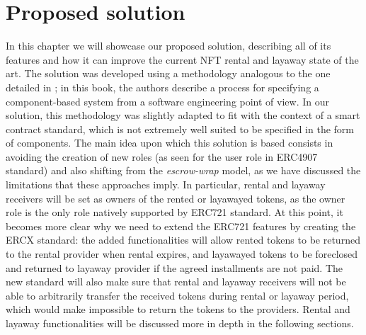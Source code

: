 \documentclass[english, LaM, oneside]{sapthesis}%
\begin{document}
\chapter{Proposed solution}
\label{chap:2}
In this chapter we will showcase our proposed solution, describing all of its features and how it can improve the current NFT rental and layaway state of the art. \newline
The solution was developed using a methodology analogous to the one detailed in \cite{ref:UML}; in this book, the authors describe a process for specifying a component-based system from a software engineering point of view. In our solution, this methodology was slightly adapted to fit with the context of a smart contract standard, which is not extremely well suited to be specified in the form of components.\newline
The main idea upon which this solution is based consists in avoiding the creation of new roles (as seen for the user role in ERC4907 standard) and also shifting from the \textit{escrow-wrap} model, as we have discussed the limitations that these approaches imply. \newline
In particular, rental and layaway receivers will be set as owners of the rented or layawayed tokens, as the owner role is the only role natively supported by ERC721 standard. At this point, it becomes more clear why we need to extend the ERC721 features by creating the ERCX standard: the added functionalities will allow rented tokens to be returned to the rental provider when rental expires, and layawayed tokens to be foreclosed and returned to layaway provider if the agreed installments are not paid. The new standard will also make sure that rental and layaway receivers will not be able to arbitrarily transfer the received tokens during rental or layaway period, which would make impossible to return the tokens to the providers. \newline
Rental and layaway functionalities will be discussed more in depth in the following sections.
\end{document}

